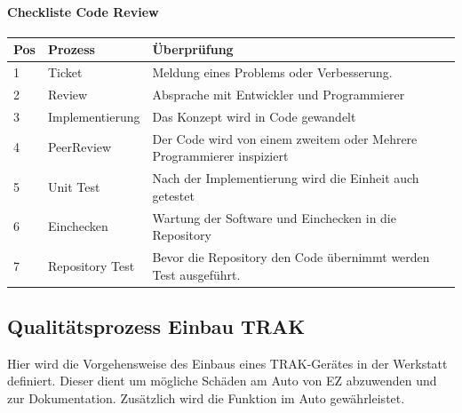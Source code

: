 \documentclass[a4paper,10pt]{scrartcl}
\begin{document}
\paragraph{\large{Checkliste Code Review}}
\begin{flushleft}
\begin{tabular}{lll} 
\toprule
\textbf{Pos} & \textbf{Prozess} & \textbf{Überprüfung}\\ 
\midrule 
\midrule
1  & Ticket & Meldung eines Problems oder Verbesserung. \\
\midrule
2  & Review & Absprache mit Entwickler und Programmierer \\
\midrule
3  & Implementierung & Das Konzept wird in Code gewandelt \\
\midrule
4  & PeerReview & Der Code wird von einem zweitem oder Mehrere Programmierer inspiziert \\
\midrule
5  & Unit Test & Nach der Implementierung wird die Einheit auch getestet \\
\midrule
6  & Einchecken & Wartung der Software und Einchecken in die Repository \\
\midrule
7  & Repository Test & Bevor die Repository den Code übernimmt werden Test ausgeführt.\\
\bottomrule
\end{tabular}
\end{flushleft}


\subsection{Qualitätsprozess Einbau TRAK}

Hier wird die Vorgehensweise des Einbaus eines TRAK-Gerätes in der Werkstatt definiert. Dieser dient um mögliche Schäden am Auto von EZ abzuwenden und zur Dokumentation. Zusätzlich wird die Funktion im Auto gewährleistet.

\vspace{5mm}

  
\end{document}

